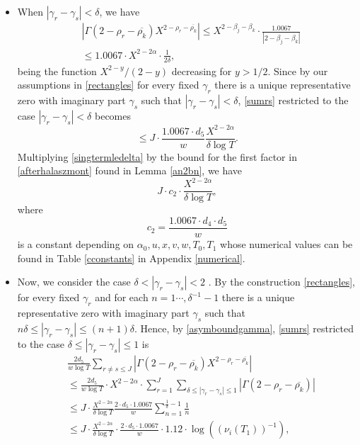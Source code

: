 \documentclass[reqno]{amsart}
\numberwithin{equation}{section}
\theoremstyle{remark}
\begin{document}
\begin{itemize}
\item When $|\gamma_r-\gamma_s|<\delta$, we have
\begin{equation*}
\begin{aligned}
      &\left|\Gamma\left(2-\rho_r-\overline{\rho_k}\right)X^{2-\rho_r-\overline{\rho_k}}\right|\le X^{2-\beta_j-\beta_k}\cdot \frac{1.0067}{|2-\beta_j-\beta_k|}\\&\le 1.0067\cdot X^{2-2\alpha}\cdot \frac{1}{2\delta} ,
\end{aligned}
\end{equation*}
 being the function $X^{2-y}/(2-y)$ decreasing for $y>1/2$. Since by our assumptions in \eqref{rectangles} for every fixed $\gamma_r$ there is a unique representative zero with imaginary part $\gamma_s$ such that $|\gamma_r-\gamma_s|<\delta$, \eqref{sumrs} restricted to the case $|\gamma_r-\gamma_s|<\delta$  becomes
\begin{equation}\label{singtermledelta}
    \le J\cdot \frac{1.0067\cdot d_5}{w} \frac{X^{2-2\alpha}}{\delta \log T}.
\end{equation}
Multiplying \eqref{singtermledelta} by the bound for the first factor in \eqref{afterhalaszmont} found in Lemma \ref{an2bn}, we have
\begin{equation}\label{boundc2}
     J\cdot c_2 \cdot \frac{X^{2-2\alpha}}{\delta \log T},
\end{equation}
where
\[
c_2=   \frac{1.0067\cdot d_4\cdot d_5}{w}
\]
is a constant depending on $\alpha_0,u,x,v,w,T_0,T_1$ whose numerical values can be found in Table \ref{cconstants} in Appendix \ref{numerical}.
\item Now, we consider the case $\delta<|\gamma_r-\gamma_s|<2$ . By the construction \eqref{rectangles}, for every fixed $\gamma_r$ and for each $n=1\cdots, \delta^{-1}-1$ there is a unique representative zero with imaginary part $\gamma_s$ such that $n\delta\le |\gamma_r-\gamma_s|\le (n+1)\delta$. Hence, by \eqref{asymboundgamma}, \eqref{sumrs} restricted to the case $\delta\le |\gamma_r-\gamma_s|\le 1$ is
\begin{equation}\label{singbet1anddelta}
\begin{aligned}
    &\frac{ 2d_5}{w\log T}\sum_{r\ne s\le J} \left|\Gamma\left(2-\rho_r-\overline{\rho_k}\right)X^{2-\rho_r-\overline{\rho_k}}\right|\\&\le \frac{ 2d_5}{w\log T}\cdot X^{2-2\alpha}\cdot \sum_{r=1}^J\sum_{\delta\le|\gamma_r-\gamma_s|\le 1}\left|\Gamma\left(2-\rho_r-\overline{\rho_k}\right)\right|\\&\le  J\cdot \frac{X^{2-2\alpha}}{\delta\log T}\frac{ 2\cdot d_5\cdot 1.0067}{w} \sum_{n=1}^{\frac{1}{\delta}-1}\frac{1}{n}\\&\le J\cdot \frac{X^{2-2\alpha}}{\delta\log T}\cdot \frac{ 2\cdot d_5\cdot 1.0067}{w}\cdot 1.12\cdot \log((\nu_i(T_1))^{-1}),

\end{aligned}
\end{equation}
\end{itemize}
\end{document}
